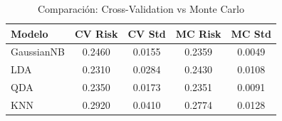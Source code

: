 \documentclass[10pt]{article}
\begin{document}
\begin{table}[!ht]
    \centering
    \caption{Comparación: Cross-Validation vs Monte Carlo}
    \label{tab:comparacion_cv_mc}
    \begin{tabular}{lcccc}
        \hline
        \textbf{Modelo} & \textbf{CV Risk} & \textbf{CV Std} & \textbf{MC Risk} & \textbf{MC Std} \\
        \hline
        GaussianNB & 0.2460 & 0.0155 & 0.2359 & 0.0049 \\
        LDA & 0.2310 & 0.0284 & 0.2430 & 0.0108 \\
        QDA & 0.2350 & 0.0173 & 0.2351 & 0.0091 \\
        KNN & 0.2920 & 0.0410 & 0.2774 & 0.0128 \\
        \hline
    \end{tabular}
\end{table}
\end{document}
